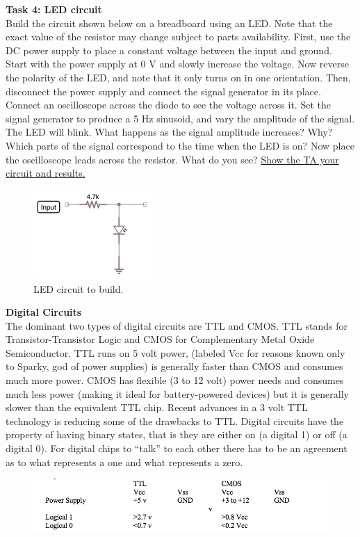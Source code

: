 \documentclass[12pt]{article}
\begin{document}
\begin{enumerate}[1.]
{\bf Task 4: LED circuit}\\
Build the circuit shown below on a breadboard using an LED.
Note that the exact value of the resistor may change subject to parts availability.
First, use the DC power supply to place a constant voltage between the input and ground. 
Start with the power supply at 0 V and slowly increase the voltage.
Now reverse the polarity of the LED, and note that it only turns on in one orientation.
Then, disconnect the power supply and connect the signal generator in its place. 
Connect an oscilloscope across the diode to see the voltage across it.
Set the signal generator to produce a 5 Hz sinusoid, and vary the amplitude of the signal. 
The LED will blink.
What happens as the signal amplitude increases? Why? Which parts of the signal correspond to the time when the LED is on?
Now place the oscilloscope leads across the resistor. What do you see? \underline{Show the TA your circuit and results.}
\begin{figure}[!ht]
\begin{center}
\includegraphics[width=0.4\textwidth,trim=0 0 0 0,clip=false]{ledcircuit.png}
\caption*{LED circuit to build.}
\end{center}
\end{figure}

{\bf Digital Circuits}\\
The dominant two types of digital circuits are TTL and CMOS. 
TTL stands for Transistor-Transistor Logic and CMOS for Complementary Metal Oxide Semiconductor. 
TTL runs on 5 volt power, (labeled Vcc for reasons known only to Sparky, god of power supplies) is generally faster than CMOS and consumes much more power. 
CMOS has flexible (3 to 12 volt) power needs and consumes much less power (making it ideal for battery-powered devices) but it is generally slower than the equivalent TTL chip. 
Recent advances in a 3 volt TTL technology is reducing some of the drawbacks to TTL. 
Digital circuits have the property of having binary states, that is they are either on (a digital 1) or off (a digital 0). 
For digital chips to ``talk'' to each other there has to be an agreement as to what represents a one and what represents a zero.
\begin{figure}[!ht]
\begin{center}
\includegraphics[width=\textwidth,trim=0 0 0 0,clip=false]{logicvoltages.png}
\end{center}
\end{figure}


\end{enumerate}
\end{document}
